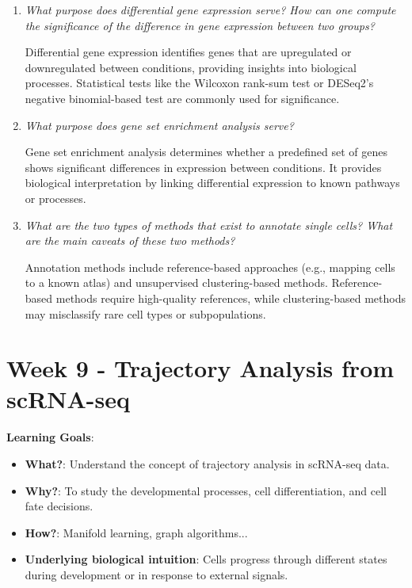 \documentclass[a4paper]{article}
\begin{document}
\begin{enumerate}
    \item \textit{What purpose does differential gene expression serve? How can one compute the significance of the difference in gene expression between two groups?}  
    
    Differential gene expression identifies genes that are upregulated or downregulated between conditions, providing insights into biological processes.  
    Statistical tests like the Wilcoxon rank-sum test or DESeq2's negative binomial-based test are commonly used for significance.  

    \item \textit{What purpose does gene set enrichment analysis serve?}  
    
    Gene set enrichment analysis determines whether a predefined set of genes shows significant differences in expression between conditions.  
    It provides biological interpretation by linking differential expression to known pathways or processes.  

    \item \textit{What are the two types of methods that exist to annotate single cells? What are the main caveats of these two methods?}  
    
    Annotation methods include reference-based approaches (e.g., mapping cells to a known atlas) and unsupervised clustering-based methods.  
    Reference-based methods require high-quality references, while clustering-based methods may misclassify rare cell types or subpopulations.  
\end{enumerate}

\newpage

\section*{Week 9 - Trajectory Analysis from scRNA-seq}

\textbf{Learning Goals}:

\begin{itemize}
  \item \textbf{What?}: Understand the concept of trajectory analysis in scRNA-seq data.
  \item \textbf{Why?}: To study the developmental processes, cell differentiation, and cell fate decisions.
  \item \textbf{How?}: Manifold learning, graph algorithms...
  \item \textbf{Underlying biological intuition}: Cells progress through different states during development or in response to external signals.
\end{itemize}
\end{document}
